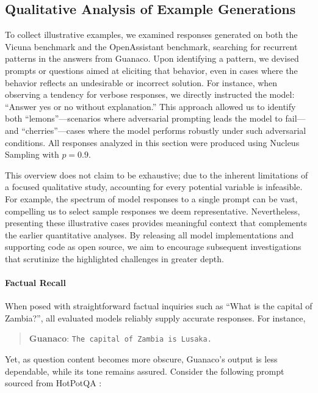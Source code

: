 \subsection{Qualitative Analysis of Example Generations}
\label{ssec:examples}

To collect illustrative examples, we examined responses generated on both the Vicuna benchmark and the OpenAssistant benchmark, searching for recurrent patterns in the answers from {Guanaco}. Upon identifying a pattern, we devised prompts or questions aimed at eliciting that behavior, even in cases where the behavior reflects an undesirable or incorrect solution. For instance, when observing a tendency for verbose responses, we directly instructed the model: ``Answer yes or no without explanation.'' This approach allowed us to identify both ``lemons''—scenarios where adversarial prompting leads the model to fail—and ``cherries''—cases where the model performs robustly under such adversarial conditions. All responses analyzed in this section were produced using Nucleus Sampling \cite{holtzmancurious} with $p=0.9$.

This overview does not claim to be exhaustive; due to the inherent limitations of a focused qualitative study, accounting for every potential variable is infeasible. For example, the spectrum of model responses to a single prompt can be vast, compelling us to select sample responses we deem representative. Nevertheless, presenting these illustrative cases provides meaningful context that complements the earlier quantitative analyses. By releasing all model implementations and supporting code as open source, we aim to encourage subsequent investigations that scrutinize the highlighted challenges in greater depth.

\paragraph{Factual Recall} When posed with straightforward factual inquiries such as ``What is the capital of Zambia?'', all evaluated models reliably supply accurate responses. For instance,

\begin{quote} 
    \textbf{Guanaco}:
    \texttt{The capital of Zambia is Lusaka.}
\end{quote}

Yet, as question content becomes more obscure, {Guanaco}’s output is less dependable, while its tone remains assured. Consider the following prompt sourced from HotPotQA \citep{yang2018hotpotqa}:


